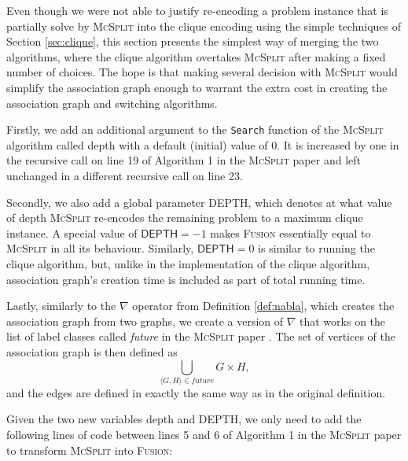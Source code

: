 \documentclass{l4proj}
\theoremstyle{definition}
\theoremstyle{remark}
\begin{document}
Even though we were not able to justify re-encoding a problem instance that is
partially solve by \textsc{McSplit} into the clique encoding using the simple
techniques of Section \ref{sec:clique}, this section presents the simplest way of
merging the two algorithms, where the clique algorithm overtakes
\textsc{McSplit} after making a fixed number of choices. The hope is that making
several decision with \textsc{McSplit} would simplify the association graph
enough to warrant the extra cost in creating the association graph and switching
algorithms.

Firstly, we add an additional argument to the \texttt{Search} function of the
\textsc{McSplit} algorithm \cite{DBLP:conf/ijcai/McCreeshPT17} called
\textsf{depth} with a default (initial) value of 0. It is increased by one in
the recursive call on line 19 of Algorithm 1 in the \textsc{McSplit} paper
\cite{DBLP:conf/ijcai/McCreeshPT17} and left unchanged in a different recursive
call on line 23.

Secondly, we also add a global parameter \textsf{DEPTH}, which denotes at what value of
\textsf{depth} \textsc{McSplit} re-encodes the remaining problem to a maximum
clique instance. A special value of $\textsf{DEPTH} = -1$ makes \textsc{Fusion}
essentially equal to \textsc{McSplit} in all its behaviour. Similarly,
$\textsf{DEPTH} = 0$ is similar to running the clique algorithm, but, unlike in
the implementation of the clique algorithm, association graph's creation time is
included as part of total running time.

Lastly, similarly to the $\nabla$ operator from Definition \ref{def:nabla},
which creates the association graph from two graphs, we create a version of
$\nabla$ that works on the list of label classes called \textit{future} in the
\textsc{McSplit} paper \cite{DBLP:conf/ijcai/McCreeshPT17}. The set of vertices
of the association graph is then defined as
\[ \bigcup_{\langle G, H \rangle \in \textit{future}} G \times H, \]
and the edges are defined in exactly the same way as in the original definition.

Given the two new variables \textsf{depth} and \textsf{DEPTH}, we only need to
add the following lines of code between lines 5 and 6 of Algorithm 1 in the
\textsc{McSplit} paper \cite{DBLP:conf/ijcai/McCreeshPT17} to transform
\textsc{McSplit} into \textsc{Fusion}:

\begin{algorithm}
\end{algorithm}
\end{document}
